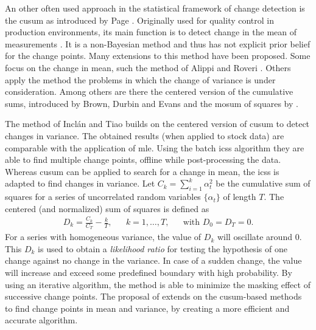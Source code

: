 
An other often used approach in the statistical framework of change detection is the \gls{cusum} as introduced by Page \cite{page1954continuous}.
Originally used for quality control in production environments, its main function is to detect change in the mean of measurements \cite{basseville1993detection}.
It is a non-Bayesian method and thus has not explicit prior belief for the change points.
Many extensions to this method have been proposed.
Some focus on the change in mean, such the method of Alippi and Roveri \cite{alippi2006adaptive}.
Others apply the method the problems in which the change of variance is under consideration.
Among others are there the centered version of the cumulative sums, introduced by Brown, Durbin and Evans \cite{brown1975techniques} and the \gls{mosum} of squares by \cite{hsu2007mosum}.

The method of Incl\'{a}n and Tiao \cite{inclan1994use} builds on the centered version of \gls{cusum} \cite{brown1975techniques} to detect changes in variance.
The obtained results (when applied to stock data) are comparable with the application of \gls{mle}.
Using the batch \gls{icss} algorithm they are able to find multiple change points, offline while post-processing the data.
Whereas \gls{cusum} can be applied to search for a change in mean, the \gls{icss} is adapted to find changes in variance.
Let $C_k = \sum_{i=1}^k \alpha_t^2$ be the cumulative sum of squares for a series of uncorrelated random variables $\{\alpha_t\}$ of length $T$.
The centered (and normalized) sum of squares is defined as
\begin{equation}
  \begin{aligned}
  D_k = \frac{C_k}{C_T} - \frac{k}{T}, & & k = 1, \dots, T, & & \text{with } D_0 = D_T = 0.
  \end{aligned}
\end{equation}
For a series with homogeneous variance, the value of $D_k$ will oscillate around $0$.
This $D_k$ is used to obtain a \emph{likelihood ratio} for testing the hypothesis of one change against no change in the variance.
In case of a sudden change, the value will increase and exceed some predefined boundary with high probability.
By using an iterative algorithm, the method is able to minimize the masking effect of successive change points.
The proposal of \cite{cheng2009efficient} extends on the \gls{cusum}-based methods to find change points in mean and variance, by creating a more efficient and accurate algorithm.


